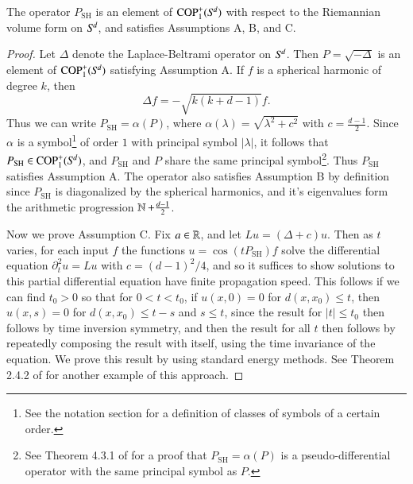 \begin{lemma} \label{lemmaoijioawjdioawjdw}
  The operator $P_{\text{SH}}$ is an element of ${\text{COP}^{+}_{{1}}}({S}^{\!{d}})$ with respect to the Riemannian volume form on ${S}^{\!{d}}$, and satisfies Assumptions A, B, and C.
\end{lemma}
\begin{proof}
  Let $\Delta$ denote the Laplace-Beltrami operator on ${S}^{\!{d}}$. Then $P = \sqrt{-\Delta}$ is an element of ${\text{COP}^{+}_{{1}}}({S}^{\!{d}})$ satisfying Assumption A. If $f$ is a spherical harmonic of degree $k$, then
  \begin{equation}
    \Delta f = - \sqrt{k(k+d-1)} f.
  \end{equation}
  Thus we can write $P_{\text{SH}} = \alpha(P)$, where $\alpha(\lambda) = \sqrt{ \lambda^2 + c^2 }$ with $c = \tfrac{d-1}{2}$. Since $\alpha$ is a symbol\footnote{See the notation section for a definition of classes of symbols of a certain order.} of order $1$ with principal symbol $|\lambda|$, it follows that $P_{\text{SH}} \in {\text{COP}^{+}_{{1}}}({S}^{\!{d}})$, and $P_{\text{SH}}$ and $P$ share the same principal symbol\footnote{See Theorem 4.3.1 of \cite{Sogge} for a proof that $P_{\text{SH}} = \alpha(P)$ is a pseudo-differential operator with the same principal symbol as $P$.}. Thus $P_{\text{SH}}$ satisfies Assumption A. The operator also satisfies Assumption B by definition since $P_{\text{SH}}$ is diagonalized by the spherical harmonics, and it's eigenvalues form the arithmetic progression $\operatorname{\mathbb{N}} + \tfrac{d-1}{2}$.

  Now we prove Assumption C. Fix $a \in \operatorname{\mathbb{R}}$, and let $Lu = (\Delta + c) u$. Then as $t$ varies, for each input $f$ the functions $u = \cos(t P_{\text{SH}}) f$ solve the differential equation $\partial_t^2 u = Lu$ with $c = (d-1)^2/4$, and so it suffices to show solutions to this partial differential equation have finite propagation speed. This follows if we can find $t_0 > 0$ so that for $0 < t < t_0$, if $u(x,0) = 0$ for $d(x,x_0) \leq t$, then $u(x,s) = 0$ for $d(x,x_0) \leq t - s$ and $s \leq t$, since the result for $|t| \leq t_0$ then follows by time inversion symmetry, and then the result for all $t$ then follows by repeatedly composing the result with itself, using the time invariance of the equation. We prove this result by using standard energy methods. See Theorem 2.4.2 of \cite{SoggeHangzhou} for another example of this approach.


\end{proof}
